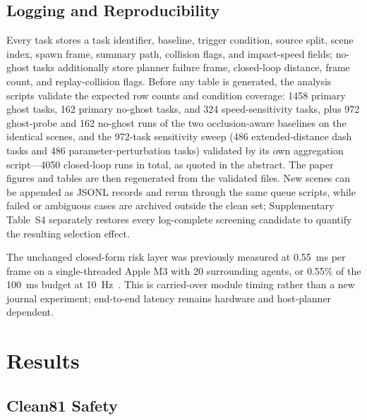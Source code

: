 \documentclass[journal]{IEEEtran}
\begin{document}
\subsection{Logging and Reproducibility}

Every task stores a task identifier, baseline, trigger condition, source split, scene index, spawn frame, summary path, collision flags, and impact-speed fields; no-ghost tasks additionally store planner failure frame, closed-loop distance, frame count, and replay-collision flags. Before any table is generated, the analysis scripts validate the expected row counts and condition coverage: 1458 primary ghost tasks, 162 primary no-ghost tasks, and 324 speed-sensitivity tasks, plus 972 ghost-probe and 162 no-ghost runs of the two occlusion-aware baselines on the identical scenes, and the 972-task sensitivity sweep (486 extended-distance dash tasks and 486 parameter-perturbation tasks) validated by its own aggregation script---4050 closed-loop runs in total, as quoted in the abstract. The paper figures and tables are then regenerated from the validated files. New scenes can be appended as JSONL records and rerun through the same queue scripts, while failed or ambiguous cases are archived outside the clean set; Supplementary Table~S4 separately restores every log-complete screening candidate to quantify the resulting selection effect.

The unchanged closed-form risk layer was previously measured at \SI{0.55}{ms} per frame on a single-threaded Apple M3 with 20 surrounding agents, or 0.55\% of the \SI{100}{ms} budget at \SI{10}{Hz}~\cite{paloi_itsc2026}. This is carried-over module timing rather than a new journal experiment; end-to-end latency remains hardware and host-planner dependent.

\section{Results}

\subsection{Clean81 Safety}
\label{subsec:clean81-safety}


\end{document}
